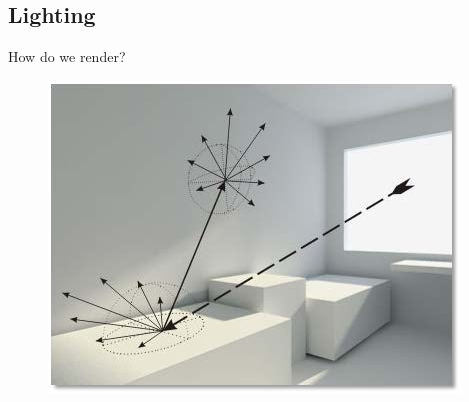 \documentclass[10pt]{beamer}
\begin{document}




\subsection{Lighting}
\begin{frame}{How do we render?}
  \begin{figure}
    \includegraphics[width=\textwidth]{indirectlighting}
  \end{figure}
\end{frame}
\end{document}
